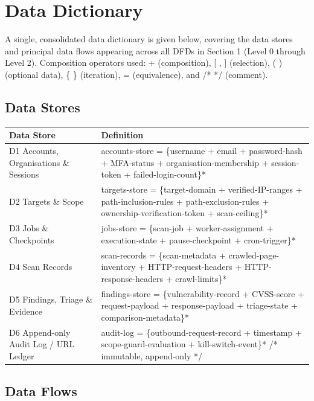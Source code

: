 \documentclass[11pt,a4paper]{article}
\begin{document}
\newpage
\section{Data Dictionary}

A single, consolidated data dictionary is given below, covering the data stores and principal data flows appearing across all DFDs in Section 1 (Level 0 through Level 2). Composition operators used: + (composition), [ , ] (selection), ( ) (optional data), \{ \} (iteration), = (equivalence), and /* */ (comment).

\subsection{Data Stores}

\begin{center}
\small
\begin{tabular}{p{4.2cm} p{11.5cm}}
\toprule
\textbf{Data Store} & \textbf{Definition} \\
\midrule
D1 Accounts, Organisations \& Sessions & accounts-store = \{username + email + password-hash + MFA-status + organisation-membership + session-token + failed-login-count\}* \\
\addlinespace
D2 Targets \& Scope & targets-store = \{target-domain + verified-IP-ranges + path-inclusion-rules + path-exclusion-rules + ownership-verification-token + scan-ceiling\}* \\
\addlinespace
D3 Jobs \& Checkpoints & jobs-store = \{scan-job + worker-assignment + execution-state + pause-checkpoint + cron-trigger\}* \\
\addlinespace
D4 Scan Records & scan-records = \{scan-metadata + crawled-page-inventory + HTTP-request-headers + HTTP-response-headers + crawl-limits\}* \\
\addlinespace
D5 Findings, Triage \& Evidence & findings-store = \{vulnerability-record + CVSS-score + request-payload + response-payload + triage-state + comparison-metadata\}* \\
\addlinespace
D6 Append-only Audit Log / URL Ledger & audit-log = \{outbound-request-record + timestamp + scope-guard-evaluation + kill-switch-event\}* /* immutable, append-only */ \\
\bottomrule
\end{tabular}
\end{center}

\subsection{Data Flows}
\end{document}
